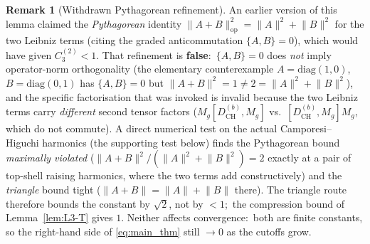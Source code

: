 \documentclass[11pt,a4paper]{article}
\theoremstyle{plain}
\theoremstyle{definition}
\newtheorem{remark}[theorem]{Remark}
\newcommand{\norm}[1]{\lVert #1 \rVert}
\newcommand{\Mat}{M}
\newcommand{\DCH}{D_{\mathrm{CH}}}
\begin{document}
\begin{remark}[Withdrawn Pythagorean refinement]\label{rem:no_pythagorean}
An earlier version of this lemma claimed the \emph{Pythagorean}
identity $\norm{A + B}_{\mathrm{op}}^2 = \norm{A}^2 + \norm{B}^2$ for
the two Leibniz terms (citing the graded anticommutation
$\{A,B\}=0$), which would have given $C_3^{(2)} < 1$. That refinement
is \textbf{false}:\ $\{A,B\}=0$ does \emph{not} imply operator-norm
orthogonality (the elementary counterexample
$A=\mathrm{diag}(1,0)$, $B=\mathrm{diag}(0,1)$ has $\{A,B\}=0$ but
$\norm{A+B}^2 = 1 \ne 2 = \norm{A}^2+\norm{B}^2$), and the
specific factorisation that was invoked is invalid because the two
Leibniz terms carry \emph{different} second tensor factors
($\Mat_g[\DCH^{(b)},\Mat_g]$ vs.\ $[\DCH^{(b)},\Mat_g]\Mat_g$, which do
not commute). A direct numerical test on the actual Camporesi--Higuchi
harmonics (the supporting test below) finds the Pythagorean bound
\emph{maximally violated} ($\norm{A+B}^2 / (\norm{A}^2+\norm{B}^2) = 2$
exactly at a pair of top-shell raising harmonics, where the two terms
add constructively) and the \emph{triangle} bound tight
($\norm{A+B} = \norm{A}+\norm{B}$ there). The triangle route therefore
bounds the constant by $\sqrt 2$, not by $<1$;\ the compression bound of
Lemma~\ref{lem:L3-T} gives $1$. Neither affects
convergence:\ both are finite constants, so the right-hand side of
\eqref{eq:main_thm} still $\to 0$ as the cutoffs grow.
\end{remark}
\end{document}
